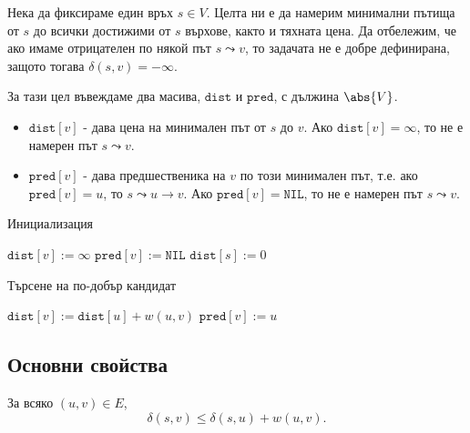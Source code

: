 Нека да фиксираме един връх $s \in V$.
Целта ни е да намерим минимални пътища от $s$ до всички достижими от $s$ върхове,
както и тяхната цена. 
Да отбележим, че ако имаме отрицателен по някой път $s \leadsto v$, то задачата не е добре 
дефинирана, защото тогава $\delta(s,v) = -\infty$.

За тази цел въвеждаме два масива, $\texttt{dist}$ и $\texttt{pred}$, с дължина $\abs{V}$.
\begin{itemize}
\item 
  $\texttt{dist}[v]$ - дава цена на минимален път от $s$ до $v$.
  Ако $\texttt{dist}[v] = \infty$, то не е намерен път $s\leadsto v$.
\item
  $\texttt{pred}[v]$ - дава предшественика на $v$ по този минимален път, т.е.
  ако $\texttt{pred}[v] = u$, то $s \leadsto u \to v$.
  Ако $\texttt{pred}[v] = \texttt{NIL}$, то не е намерен път $s \leadsto v$.
\end{itemize}

\begin{algorithm}[h!]
  \caption{Инициализация}
  \label{alg:init}
  \begin{algorithmic}[1]
    \State $\texttt{dist}[v] := \infty$
    \State $\texttt{pred}[v] := \texttt{NIL}$
    \EndFor
    \State $\texttt{dist}[s] := 0$
    \EndProcedure
  \end{algorithmic}
\end{algorithm}

\begin{algorithm}[h!]
  \caption{Търсене на по-добър кандидат}
  \label{alg:update}
  \begin{algorithmic}[1]
    \State $\texttt{dist}[v] := \texttt{dist}[u] + w(u,v)$
    \State $\texttt{pred}[v] := u$
    \EndIf
    \EndProcedure
  \end{algorithmic}
\end{algorithm}

\subsection{Основни свойства}
  
\begin{prop}
  \label{prop:triangle}
  За всяко $(u,v) \in E$,
  \[\delta(s,v) \leq \delta(s,u) + w(u,v).\]
\end{prop}

